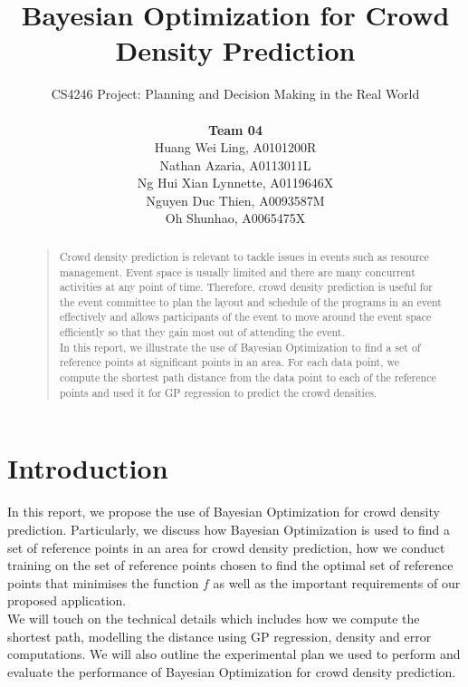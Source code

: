 \documentclass[letterpaper]{article}
\begin{document}
%
\title{Bayesian Optimization for Crowd Density Prediction}
\author{CS4246 Project: Planning and Decision Making in the Real World  \\ \\
{\bf Team 04} \\
Huang Wei Ling, A0101200R\\
Nathan Azaria, A0113011L\\
Ng Hui Xian Lynnette, A0119646X\\
Nguyen Duc Thien, A0093587M\\
Oh Shunhao, A0065475X\\
}
\maketitle
\begin{abstract}
\begin{quote}
Crowd density prediction is relevant to tackle issues in events such as resource management. Event space is usually limited and there are many concurrent activities at any point of time. Therefore, crowd density prediction is useful for the event committee to plan the layout and schedule of the programs in an event effectively and allows participants of the event to move around the event space efficiently so that they gain most out of attending the event. \\

In this report, we illustrate the use of Bayesian Optimization to find a set of reference points at significant points in an area. For each data point, we compute the shortest path distance from the data point to each of the reference points and used it for GP regression to predict the crowd densities.
\end{quote}
\end{abstract}

\section{Introduction}
In this report, we propose the use of Bayesian Optimization for crowd density prediction. Particularly, we discuss how Bayesian Optimization is used to find a set of reference points in an area for crowd density prediction, how we conduct training on the set of reference points chosen to find the optimal set of reference points that minimises the function $f$ as well as the important requirements of our proposed application. \\

We will touch on the technical details which includes how we compute the shortest path, modelling the distance using GP regression, density and error computations. We will also outline the experimental plan we used to perform and evaluate the performance of Bayesian Optimization for crowd density prediction. \\
\end{document}

